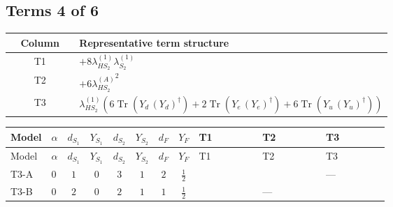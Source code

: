\documentclass[8pt]{article}
\begin{document}
\begin{landscape}
\subsection*{Terms 4 of 6}
\begin{center}
\begin{tabular}{@{}c >{\raggedright\arraybackslash}p{0.82\linewidth}@{}}
\toprule
Column & Representative term structure \\
\midrule
T1 & \(\displaystyle +8 {\lambda_{HS_2}^{(1)}} {\lambda_{S_2}^{(1)}}\) \\
\midrule
T2 & \(\displaystyle +6 {\lambda_{HS_2}^{(A)}}^2\) \\
\midrule
T3 & \(\displaystyle {\lambda_{HS_2}^{(1)}} (6 \operatorname{Tr}\!\left({Y_d}\,\left({Y_d}\right)^{\dagger}\right)+2 \operatorname{Tr}\!\left({Y_e}\,\left({Y_e}\right)^{\dagger}\right)+6 \operatorname{Tr}\!\left({Y_u}\,\left({Y_u}\right)^{\dagger}\right))\) \\
\midrule
\bottomrule
\end{tabular}
\end{center}
\smallskip
\tiny
\begin{longtable}{@{}llcccccc >{\raggedright\arraybackslash}p{0.21\linewidth} >{\raggedright\arraybackslash}p{0.21\linewidth} >{\raggedright\arraybackslash}p{0.21\linewidth}@{}}
\toprule
Model & $\alpha$ & $d_{S_1}$ & $Y_{S_1}$ & $d_{S_2}$ & $Y_{S_2}$ & $d_F$ & $Y_F$ & T1 & T2 & T3 \\
\midrule
\endfirsthead
\toprule
Model & $\alpha$ & $d_{S_1}$ & $Y_{S_1}$ & $d_{S_2}$ & $Y_{S_2}$ & $d_F$ & $Y_F$ & T1 & T2 & T3 \\
\midrule
\endhead
T3-A & $0$ & $1$ & $0$ & $3$ & $1$ & $2$ & $\frac{1}{2}$ & \scriptsize\adjustbox{max width=\linewidth}{$\begin{gathered} +8 {\lambda_{HS_2}^{(1)}} {\lambda_{S_2}^{(1)}}\end{gathered}$} & \scriptsize\adjustbox{max width=\linewidth}{$\begin{gathered} +6 {\lambda_{HS_2}^{(A)}}^2\end{gathered}$} & --- \\
\midrule
T3-B & $0$ & $2$ & $0$ & $2$ & $1$ & $1$ & $\frac{1}{2}$ & \scriptsize\adjustbox{max width=\linewidth}{$\begin{gathered} +6 {\lambda_{HS_2}^{(1)}} {\lambda_{S_2}^{(1)}}\end{gathered}$} & --- & \scriptsize\adjustbox{max width=\linewidth}{$\begin{gathered} {\lambda_{HS_2}^{(1)}} (6 \operatorname{Tr}\!\left({Y_d}\,\left({Y_d}\right)^{\dagger}\right)+2 \operatorname{Tr}\!\left({Y_e}\,\left({Y_e}\right)^{\dagger}\right)+6 \operatorname{Tr}\!\left({Y_u}\,\left({Y_u}\right)^{\dagger}\right))\end{gathered}$} \\

\end{longtable}
\end{landscape}
\end{document}
